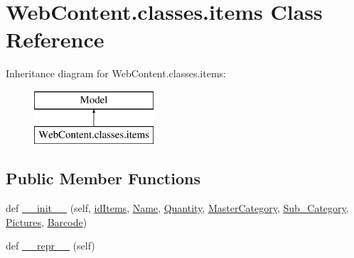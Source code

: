 \hypertarget{class_web_content_1_1classes_1_1items}{}\section{Web\+Content.\+classes.\+items Class Reference}
\label{class_web_content_1_1classes_1_1items}
Inheritance diagram for Web\+Content.\+classes.\+items\+:\begin{figure}[H]
\begin{center}
\leavevmode
\includegraphics[height=2.000000cm]{class_web_content_1_1classes_1_1items}
\end{center}
\end{figure}
\subsection*{Public Member Functions}
\begin{DoxyCompactItemize}
\item 
def \hyperlink{class_web_content_1_1classes_1_1items_afba53e358f6f442934b6ff98bb0172c2}{\+\_\+\+\_\+init\+\_\+\+\_\+} (self, \hyperlink{class_web_content_1_1classes_1_1items_ae81c7aff4b6699e4b73fdc2c58e7c17f}{id\+Items}, \hyperlink{class_web_content_1_1classes_1_1items_a6a1379cac2a7bf703ceb71edecf3acc5}{Name}, \hyperlink{class_web_content_1_1classes_1_1items_a7105b3f7ed1d73cf52a44da05cfff28f}{Quantity}, \hyperlink{class_web_content_1_1classes_1_1items_ab8196afab5769ae5b04ecf49b2d4d7f5}{Master\+Category}, \hyperlink{class_web_content_1_1classes_1_1items_a44695dda5b4093b841ea73cbec40dd4f}{Sub\+\_\+\+Category}, \hyperlink{class_web_content_1_1classes_1_1items_a74c7139df2b88c915288895e82362451}{Pictures}, \hyperlink{class_web_content_1_1classes_1_1items_a869446b40bb9b616dc8467ba8fdf8f08}{Barcode})
\item 
def \hyperlink{class_web_content_1_1classes_1_1items_af090fcd951f16fc9e653dd0ca161dbcb}{\+\_\+\+\_\+repr\+\_\+\+\_\+} (self)
\end{DoxyCompactItemize}
